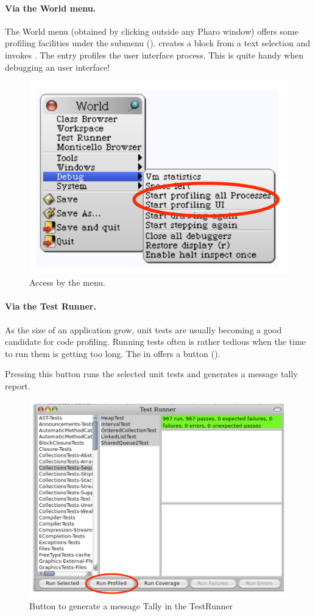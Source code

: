 \documentclass[a4paper,10pt,twoside]{book}
\begin{document}
\paragraph{Via the World menu.}
The World menu (obtained by clicking outside any Pharo window) offers some profiling facilities under the  submenu ().  creates a block from a text selection and invokes . The entry  profiles the user interface process. This is quite handy when debugging an user interface!

\begin{figure}[h]
	\begin{center}
	\includegraphics[width=.6\linewidth]{menu}
	\caption{Access by the menu.}
	\end{center}
\end{figure}



\paragraph{Via the Test Runner.}
As the size of an application grow, unit tests are usually becoming a good candidate for code profiling. Running tests often is rather tedious when the time to run them is getting too long. The  in \pharo offers a button  (). 

Pressing this button runs the selected unit tests and generates a message tally report. 

\begin{figure}[h]
	\begin{center}
	\includegraphics[width=.8\linewidth]{testRunner}
	\caption{Button to generate a message Tally in the TestRunner}
	\end{center}
\end{figure}
\end{document}
